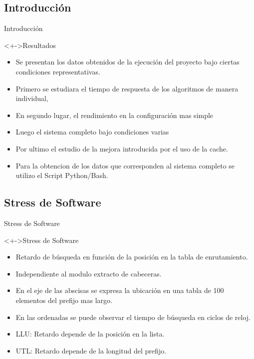 \documentclass[xcolor=dvipsnames]{beamer}
\begin{document}
\subsection{Introducción}
\begin{frame}{Introducción}
	\begin{block}<+->{Resultados}  
	 \begin{itemize}	
		\item Se presentan los datos obtenidos de la ejecución del proyecto bajo ciertas condiciones representativas. 
		\item Primero se estudiara el tiempo de respuesta de los algoritmos de manera individual, 
		\item En segundo lugar,  el rendimiento en la configuración mas simple
		\item Luego el sistema completo bajo condiciones varias
		\item Por ultimo el estudio de la mejora introducida por el uso de la cache. 
		\item Para la obtencion de los datos que corresponden al sistema completo se utilizo el Script Python/Bash.
	\end{itemize}
  \end{block}
\end{frame}

\subsection{Stress de Software}
\begin{frame}{Stress de Software}
\begin{block}<+->{Stress de Software}   
    \begin{itemize}
      \scriptsize
     	\item Retardo de búsqueda en función de la posición en la tabla de enrutamiento.
     	\item Independiente al modulo extracto de cabeceras.
	\item En el eje de las abscisas se expresa la ubicación en una tabla de 100 elementos del prefijo mas largo.
	\item En las ordenadas se puede observar el tiempo de búsqueda en ciclos de reloj.
	\item LLU: Retardo depende de la posición en la lista.
	\item UTL: Retardo depende de la longitud del prefijo.
    \end{itemize}
  \end{block}
\end{frame}
\end{document}
